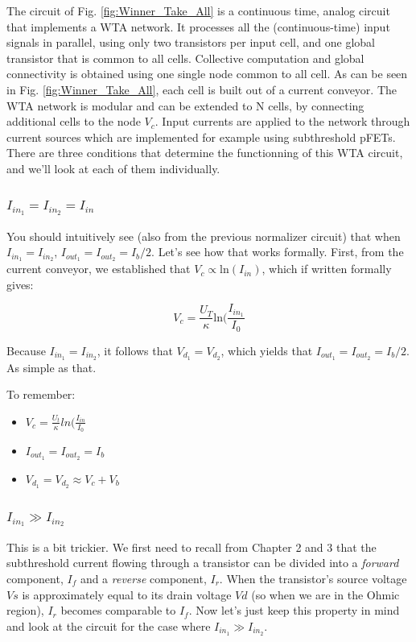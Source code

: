 The circuit of Fig. \ref{fig:Winner_Take_All} is a continuous time, analog circuit that implements a WTA network. It processes all the (continuous-time) input signals in parallel, using only two transistors per input cell, and one global transistor that is common to all cells. Collective computation and global connectivity is obtained using one single node common to all cell. As can be seen in Fig. \ref{fig:Winner_Take_All}, each cell is built out of a current conveyor. The WTA network is modular and can be extended to N cells, by connecting additional cells to the node $V_c$. Input currents are applied to the network through current sources which are implemented for example using subthreshold pFETs. There are three conditions that determine the functionning of this WTA circuit, and we'll look at each of them individually. 

\subsubsection{$I_{in_1} = I_{in_2} = I_{in}$}

You should intuitively see (also from the previous normalizer circuit) that when $I_{in_1} = I_{in_2}$, $I_{out_1} = I_{out_2} = I_b/2$. Let's see how that works formally. First, from the current conveyor, we established that $V_c \propto \mathrm{ln}(I_{in})$, which if written formally gives: 

\begin{equation}
    V_c = \frac{U_T}{\kappa}\mathrm{ln}(\frac{I_{in_1}}{I_0}
\end{equation}

Because $I_{in_1} = I_{in_2}$, it follows that $V_d_1 = V_d_2$, which yields that $I_{out_1} = I_{out_2} = I_b/2$. As simple as that. 


To remember: 

\begin{itemize}
    \item $V_c = \frac{U_t}{\kappa}ln(\frac{I_{in}}{I_0}$
    \item $I_{out}_1 = I_{out}_2 = I_b$
    \item $V_d_1 = V_d_2 \approx V_c + V_b$
\end{itemize}


\subsubsection{$I_{in_1} \gg I_{in_2}$}

This is a bit trickier. We first need to recall from Chapter 2 and 3 that the subthreshold current flowing through a transistor can be divided into a \textit{forward} component, $I_f$ and a \textit{reverse} component, $I_r$. When the transistor’s source voltage $Vs$ is approximately equal to its drain voltage $Vd$ (so when we are in the Ohmic region), $I_r$ becomes comparable to $I_f$. Now let's just keep this property in mind and look at the circuit for the case where $I_{in_1} \gg I_{in_2}$.

